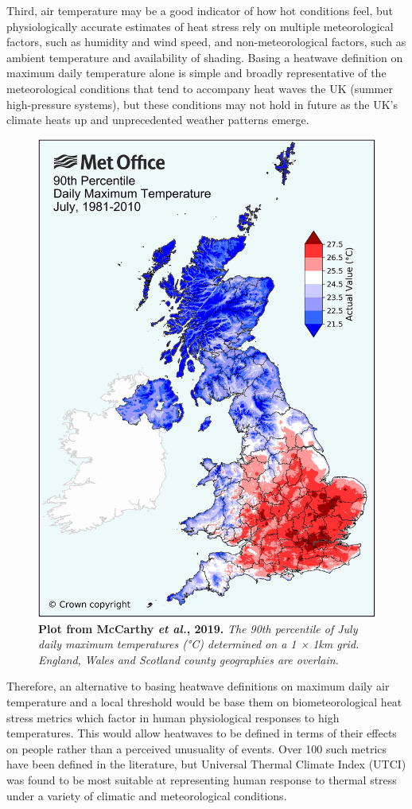 \documentclass[10pt,letterpaper]{article}
\begin{document}
Third, air temperature may be a good indicator of how hot conditions feel, but physiologically accurate estimates of heat stress rely on multiple meteorological factors, such as humidity and wind speed, and non-meteorological factors, such as ambient temperature and availability of shading.
Basing a heatwave definition on maximum daily temperature alone is simple and broadly representative of the meteorological conditions that tend to accompany heat waves the UK (summer high-pressure systems), but these conditions may not hold in future as the UK's climate heats up and unprecedented weather patterns emerge.

\begin{figure}
    \begin{center}
        \includegraphics[width=0.65\linewidth]{./mccarthy2019-fig3.jpg}
    \end{center}
    \caption{
    {\bf Plot from McCarthy \textit{et al.}, 2019.}
    \textit{The 90th percentile of July daily maximum temperatures (°C) determined on a 1 × 1km grid. England, Wales and Scotland county geographies are overlain.}\cite{McCarthy2019}
    }
    \label{McCarthy-fig3}
\end{figure}

Therefore, an alternative to basing heatwave definitions on maximum daily air temperature and a local threshold would be base them on biometeorological heat stress metrics which factor in human physiological responses to high temperatures.
This would allow heatwaves to be defined in terms of their effects on people rather than a perceived unusuality of events.
Over 100 such metrics have been defined in the literature, but Universal Thermal Climate Index (UTCI) was found to be most suitable at representing human response to thermal stress under a variety of climatic and meteorological conditions.\cite{Blazejczyk2012, DiNapoli2018, Zare2018}
\end{document}
